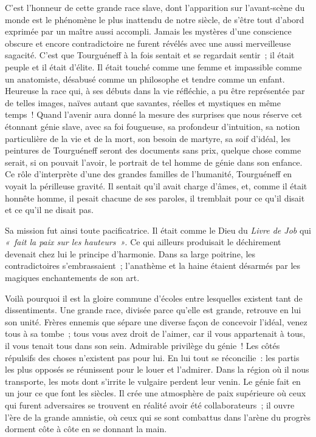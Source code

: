 \documentclass[french,twoside]{book} %
\newcommand\persName[1]{#1}
\begin{document}
C’est l’honneur de cette grande race slave, dont l’apparition sur l’avant-scène du monde est le phénomène le plus inattendu de notre siècle, de s’être tout d’abord exprimée par un maître aussi accompli. Jamais les mystères d’une conscience obscure et encore contradictoire ne furent révélés avec une aussi merveilleuse sagacité. C’est que {\persName Tourguéneff} à la fois sentait et se regardait sentir ; il était peuple et il était d’élite. Il était touché comme une femme et impassible comme un anatomiste, désabusé comme un philosophe et tendre comme un enfant. Heureuse la race qui, à ses débuts dans la vie réfléchie, a pu être représentée par de telles images, naïves autant que savantes, réelles et mystiques en même temps ! Quand l’avenir aura donné la mesure des surprises que nous réserve cet étonnant génie slave, avec sa foi fougueuse, sa profondeur d’intuition, sa notion particulière de la vie et de la mort, son besoin de martyre, sa soif d’idéal, les peintures de Tourguéneff seront des documents sans prix, quelque chose comme serait, si on pouvait l’avoir, le portrait de tel homme de génie dans son enfance. Ce rôle d’interprète d’une des grandes familles de l’humanité, Tourguéneff en voyait la périlleuse gravité. Il sentait qu’il avait charge d’âmes, et, comme il était honnête homme, il pesait chacune de ses paroles, il tremblait pour ce qu’il disait et ce qu’il ne disait pas.\par
Sa mission fut ainsi toute pacificatrice. Il était comme le {\persName Dieu} du \emph{Livre de Job} qui \emph{« fait la paix sur les hauteurs »}. Ce qui ailleurs produisait le déchirement devenait chez lui le principe d’harmonie. Dans sa large poitrine, les contradictoires s’embrassaient ; l’anathème et la haine étaient désarmés par les magiques enchantements de son art.\par
Voilà pourquoi il est la gloire commune d’écoles entre lesquelles existent tant de dissentiments. Une grande race, divisée parce qu’elle est grande, retrouve en lui son unité. Frères ennemis que sépare une diverse façon de concevoir l’idéal, venez tous à sa tombe ; tous vous avez droit de l’aimer, car il vous appartenait à tous, il vous tenait tous dans son sein. Admirable privilège du génie ! Les côtés répulsifs des choses n’existent pas pour lui. En lui tout se réconcilie : les partis les plus opposés se réunissent pour le louer et l’admirer. Dans la région où il nous transporte, les mots dont s’irrite le vulgaire perdent leur venin. Le génie fait en un jour ce que font les siècles. Il crée une atmosphère de paix supérieure où ceux qui furent adversaires se trouvent en réalité avoir été collaborateurs ; il ouvre l’ère de la grande amnistie, où ceux qui se sont combattus dans l’arène du progrès dorment côte à côte en se donnant la main.\par
\end{document}
